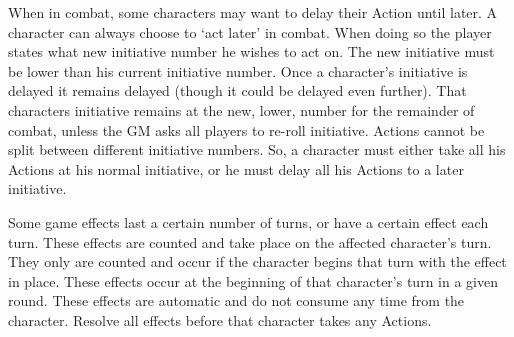 \documentclass[twoside]{book}
\begin{document}
 When in combat, some characters may want to delay
             their Action until later. A character can always choose to
             `act later' in combat. When doing so the player
             states what new initiative number he wishes to act on. The
             new initiative must be lower than his current initiative
             number. Once a character's initiative is delayed it
             remains delayed (though it could be delayed even further).
             That characters initiative remains at the new, lower, number
             for the remainder of combat, unless the GM asks all players
             to re-roll initiative. Actions cannot be split between
             different initiative numbers. So, a character must either
             take all his Actions at his normal initiative, or he must
             delay all his Actions to a later initiative. 
  

  

   Some game effects last a certain number of turns, or
             have a certain effect each turn. These effects are counted
             and take place on the affected character's turn. They
             only are counted and occur if the character begins that turn
             with the effect in place. These effects occur at the
             beginning of that character's turn in a given round.
             These effects are automatic and do not consume any time from
             the character. Resolve all effects before that character
             takes any Actions. 
  

  
\end{document}
